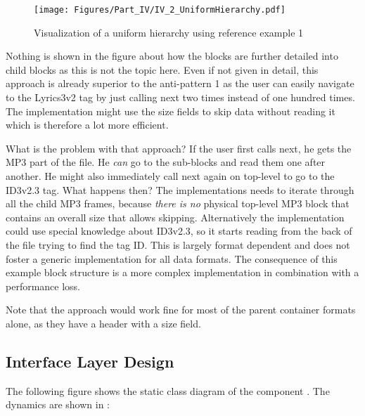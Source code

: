 \begin{figure}[H]
	\centering
	\texttt{[image: Figures/Part\_IV/IV\_2\_UniformHierarchy.pdf]}
	\caption{Visualization of a uniform hierarchy using reference example 1}
	\label{fig:IV_2_UniformHierarchy}
\end{figure}

Nothing is shown in the figure about how the blocks are further detailed into child blocks as this is not the topic here. Even if not given in detail, this approach is already superior to the anti-pattern 1 as the user can easily navigate to the Lyrics3v2 tag by just calling next two times instead of one hundred times. The implementation might use the size fields to skip data without reading it which is therefore a lot more efficient.

What is the problem with that approach? If the user first calls next, he gets the MP3 part of the file. He \emph{can} go to the sub-blocks and read them one after another. He might also immediately call next again on top-level to go to the ID3v2.3 tag. What happens then? The implementations needs to iterate through all the child MP3 frames, because \emph{there is no} physical top-level MP3 block that contains an overall size that allows skipping. Alternatively the implementation could use special knowledge about ID3v2.3, so it starts reading from the back of the file trying to find the tag ID. This is largely format dependent and does not foster a generic implementation for all data formats. The consequence of this example block structure is a more complex implementation in combination with a performance loss.

Note that the approach would work fine for most of the parent container formats alone, as they have a header with a size field.


\subsection{Interface Layer Design}
\label{sec:InterfaceDesignCOMPdataPartManagement}

The following figure shows the static class diagram of the component \COMPdataPartManagement{}. The dynamics are shown in :

